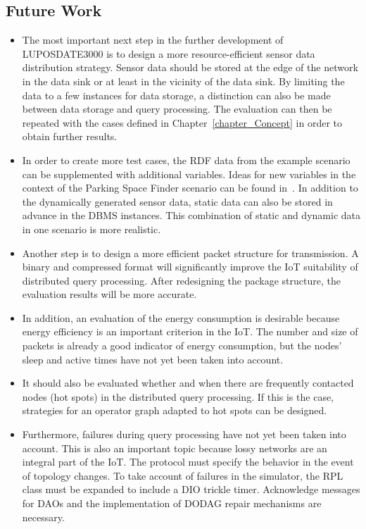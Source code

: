 \documentclass[english,version-2019-11]{uzl-thesis}
\begin{document}
\subsection{Future Work}
\begin{itemize}
 \item The most important next step in the further development of LUPOSDATE3000 is to design a more resource-efficient sensor data distribution strategy. Sensor data should be stored at the edge of the network in the data sink or at least in the vicinity of the data sink. By limiting the data to a few instances for data storage, a distinction can also be made between data storage and query processing. The evaluation can then be repeated with the cases defined in Chapter~\ref{chapter_Concept} in order to obtain further results.
 \item In order to create more test cases, the RDF data from the example scenario can be supplemented with additional variables. Ideas for new variables in the context of the Parking Space Finder scenario can be found in~\cite{parkingJson}. In addition to the dynamically generated sensor data, static data can also be stored in advance in the DBMS instances. This combination of static and dynamic data in one scenario is more realistic.
 \item Another step is to design a more efficient packet structure for transmission. A binary and compressed format will significantly improve the IoT suitability of distributed query processing. After redesigning the package structure, the evaluation results will be more accurate.
 \item In addition, an evaluation of the energy consumption is desirable because energy efficiency is an important criterion in the IoT. The number and size of packets is already a good indicator of energy consumption, but the nodes' sleep and active times have not yet been taken into account.
 \item It should also be evaluated whether and when there are frequently contacted nodes (hot spots) in the distributed query processing. If this is the case, strategies for an operator graph adapted to hot spots can be designed. 
 \item Furthermore, failures during query processing have not yet been taken into account. This is also an important topic because lossy networks are an integral part of the IoT. The protocol must specify the behavior in the event of topology changes. To take account of failures in the simulator, the RPL class must be expanded to include a DIO trickle timer. Acknowledge messages for DAOs and the implementation of DODAG repair mechanisms are necessary.

\end{itemize}
\end{document}
